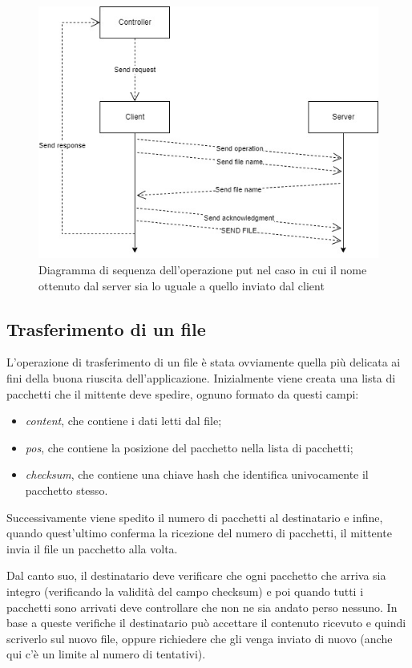 \documentclass[a4paper,12pt]{report}
\begin{document}
\begin{figure}[H]
    \centering
    \includegraphics[scale=0.55]{img/put.jpg}
    \caption{Diagramma di sequenza dell'operazione put nel caso in cui il nome ottenuto dal server sia lo uguale a quello inviato dal client}
\end{figure}

\subsection{Trasferimento di un file}
L'operazione di trasferimento di un file è stata ovviamente quella più delicata ai fini della buona riuscita dell'applicazione.
Inizialmente viene creata una lista di pacchetti che il mittente deve spedire, ognuno formato da questi campi: 
\begin{itemize}
    \item \textit{content}, che contiene i dati letti dal file;
    \item \textit{pos}, che contiene la posizione del pacchetto nella lista di pacchetti;
    \item \textit{checksum}, che contiene una chiave hash che identifica univocamente il pacchetto stesso.
\end{itemize}
Successivamente viene spedito il numero di pacchetti al destinatario e infine, quando quest'ultimo conferma la ricezione del numero di pacchetti, il mittente invia il file un pacchetto alla volta.

Dal canto suo, il destinatario deve verificare che ogni pacchetto che arriva sia integro (verificando la validità del campo checksum) e poi quando tutti i pacchetti sono arrivati deve controllare che non ne sia andato perso nessuno. In base a queste verifiche il destinatario può accettare il contenuto ricevuto e quindi scriverlo sul nuovo file, oppure richiedere che gli venga inviato di nuovo (anche qui c'è un limite al numero di tentativi).
\end{document}
